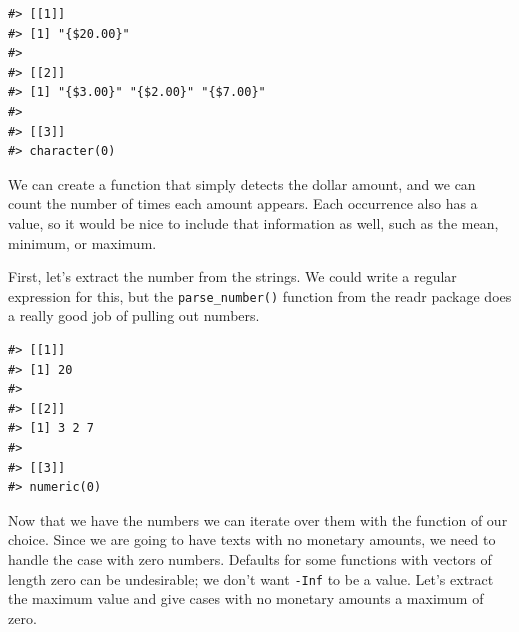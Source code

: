 \documentclass[
]{krantz}
\makeatletter
\newenvironment{Shaded}{\begin{snugshade}}{\end{snugshade}}
\newcommand{\FunctionTok}[1]{\textcolor[rgb]{0.00,0.00,0.00}{#1}}
\newcommand{\NormalTok}[1]{#1}
\newcommand{\SpecialCharTok}[1]{\textcolor[rgb]{0.00,0.00,0.00}{#1}}
\newcommand{\StringTok}[1]{\textcolor[rgb]{0.31,0.60,0.02}{#1}}
\newenvironment{kframe}{%
\medskip{}
\setlength{\fboxsep}{.8em}
 \def\at@end@of@kframe{}%
 \ifinner\ifhmode%
  \def\at@end@of@kframe{\end{minipage}}%
  \begin{minipage}{\columnwidth}%
 \fi\fi%
 \def\FrameCommand##1{\hskip\@totalleftmargin \hskip-\fboxsep
 \colorbox{shadecolor}{##1}\hskip-\fboxsep
     \hskip-\linewidth \hskip-\@totalleftmargin \hskip\columnwidth}%
 \MakeFramed {\advance\hsize-\width
   \@totalleftmargin\z@ \linewidth\hsize
   \@setminipage}}%
 {\par\unskip\endMakeFramed%
 \at@end@of@kframe}
\renewenvironment{Shaded}{\begin{kframe}}{\end{kframe}}
\makeatother
\begin{document}
\begin{verbatim}
#> [[1]]
#> [1] "{$20.00}"
#> 
#> [[2]]
#> [1] "{$3.00}" "{$2.00}" "{$7.00}"
#> 
#> [[3]]
#> character(0)
\end{verbatim}

We can create a function that simply detects the dollar amount, and we can count the number of times each amount appears.
Each occurrence also has a value, so it would be nice to include that information as well, such as the mean, minimum, or maximum.

First, let's extract the number from the strings. We could write a regular expression for this, but the \texttt{parse\_number()} function from the readr package does a really good job of pulling out numbers.

\begin{Shaded}
\end{Shaded}

\begin{verbatim}
#> [[1]]
#> [1] 20
#> 
#> [[2]]
#> [1] 3 2 7
#> 
#> [[3]]
#> numeric(0)
\end{verbatim}

Now that we have the numbers we can iterate over them with the function of our choice.
Since we are going to have texts with no monetary amounts, we need to handle the case with zero numbers. Defaults for some functions with vectors of length zero can be undesirable; we don't want \texttt{-Inf} to be a value. Let's extract the maximum value and give cases with no monetary amounts a maximum of zero.
\end{document}
